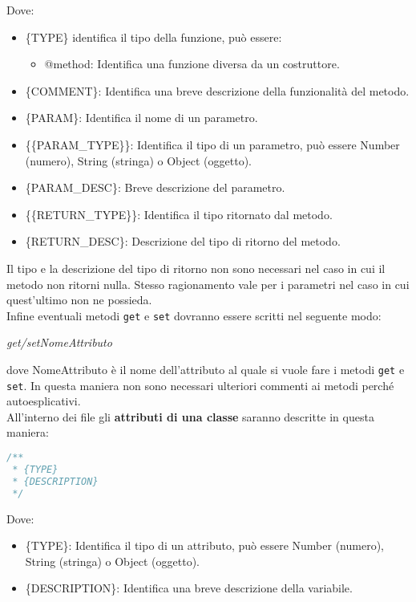 Dove:
\begin{itemize}
\item \{TYPE\} identifica il tipo della funzione, può essere:
\begin {itemize}
\item @method: Identifica una funzione diversa da un costruttore.
\end{itemize}
\item \{COMMENT\}: Identifica una breve descrizione della funzionalità del metodo.
\item \{PARAM\}: Identifica il nome di un parametro.
\item \{\{PARAM\_TYPE\}\}: Identifica il tipo di un parametro, può essere Number (numero), String (stringa) o Object (oggetto).
\item \{PARAM\_DESC\}: Breve descrizione del parametro.
\item \{\{RETURN\_TYPE\}\}: Identifica il tipo ritornato dal metodo.
\item \{RETURN\_DESC\}: Descrizione del tipo di ritorno del metodo.
\end{itemize}
Il tipo e la descrizione del tipo di ritorno non sono necessari nel caso in cui il metodo non ritorni nulla. Stesso ragionamento vale per i parametri nel caso in cui quest'ultimo non ne possieda.
\\



Infine eventuali metodi \texttt{get} e \texttt{set} dovranno essere scritti nel seguente modo:
\begin{center}
\textit{get/setNomeAttributo}
\end{center}
dove NomeAttributo è il nome dell'attributo al quale si vuole fare i metodi \texttt{get} e \texttt{set}. In questa maniera non sono necessari ulteriori commenti ai metodi perché autoesplicativi.
\\



All'interno dei file gli \textbf{attributi di una classe} saranno descritte in questa maniera:

\begin{lstlisting}[language=JavaScript]
/**
 * {TYPE}
 * {DESCRIPTION}
 */ 
\end{lstlisting}

Dove:
\begin{itemize}
\item \{TYPE\}: Identifica il tipo di un attributo, può essere Number (numero), String (stringa) o Object (oggetto).
\item \{DESCRIPTION\}: Identifica una breve descrizione della variabile.
\end{itemize}


